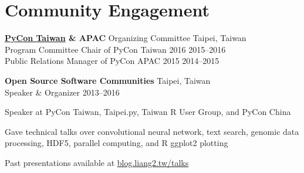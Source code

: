 \section{Community Engagement}

\begin{outerlist}
    \item {
        \bfseries
        \href{https://pycon.tw}{PyCon Taiwan}
        \& APAC%
    } Organizing Committee\hfill
    Taipei, Taiwan\\
    Program Committee Chair of PyCon Taiwan 2016\hfill
    2015--2016\\

    Public Relations Manager of PyCon APAC 2015\hfill
    2014--2015

    \item \textbf{Open Source Software Communities}\hfill
    Taipei, Taiwan\\
    Speaker \& Organizer\hfill
    2013--2016
    \begin{innerlist}
        \item Speaker at PyCon Taiwan, Taipei.py, Taiwan R User Group, and PyCon China
        \item Gave technical talks over convolutional neural network, text search, genomic data processing, HDF5, parallel computing, and R ggplot2 plotting
        \item Past presentations available at \href{http://blog.liang2.tw/talks/}{blog.liang2.tw/talks}
    \end{innerlist}
\end{outerlist}